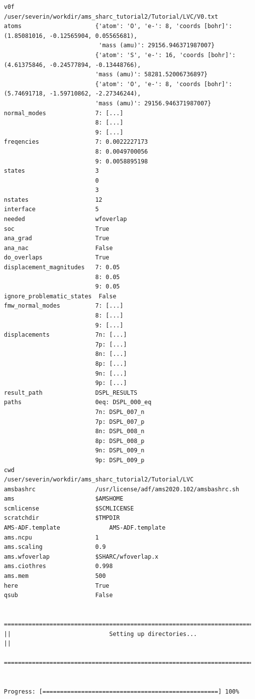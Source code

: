 \documentclass[a4paper,11pt,DIV=15,openany]{scrbook}
\begin{document}
\begin{oframed}
\begin{Verbatim}[commandchars=\\\{\}]
v0f                       /user/severin/workdir/ams_sharc_tutorial2/Tutorial/LVC/V0.txt
atoms                     {'atom': 'O', 'e-': 8, 'coords [bohr]': (1.85081016, -0.12565904, 0.05565681), 
                           'mass (amu)': 29156.946371987007}
                          {'atom': 'S', 'e-': 16, 'coords [bohr]': (4.61375846, -0.24577894, -0.13448766), 
                          'mass (amu)': 58281.52006736897}
                          {'atom': 'O', 'e-': 8, 'coords [bohr]': (5.74691718, -1.59710862, -2.27346244), 
                          'mass (amu)': 29156.946371987007}
normal_modes              7: [...]
                          8: [...]
                          9: [...]
freqencies                7: 0.0022227173
                          8: 0.0049700056
                          9: 0.0058895198
states                    3
                          0
                          3
nstates                   12
interface                 5
needed                    wfoverlap
soc                       True
ana_grad                  True
ana_nac                   False
do_overlaps               True
displacement_magnitudes   7: 0.05
                          8: 0.05
                          9: 0.05
ignore_problematic_states  False
fmw_normal_modes          7: [...]
                          8: [...]
                          9: [...]
displacements             7n: [...]
                          7p: [...]
                          8n: [...] 
                          8p: [...] 
                          9n: [...]
                          9p: [...]
result_path               DSPL_RESULTS
paths                     0eq: DSPL_000_eq
                          7n: DSPL_007_n
                          7p: DSPL_007_p
                          8n: DSPL_008_n
                          8p: DSPL_008_p
                          9n: DSPL_009_n
                          9p: DSPL_009_p
cwd                       /user/severin/workdir/ams_sharc_tutorial2/Tutorial/LVC
amsbashrc                 /usr/license/adf/ams2020.102/amsbashrc.sh
ams                       $AMSHOME
scmlicense                $SCMLICENSE
scratchdir                $TMPDIR
AMS-ADF.template              AMS-ADF.template
ams.ncpu                  1
ams.scaling               0.9
ams.wfoverlap             $SHARC/wfoverlap.x
ams.ciothres              0.998
ams.mem                   500
here                      True
qsub                      False

  ================================================================================
||                            Setting up directories...                           ||
  ================================================================================


Progress: [==================================================] 100%
\end{Verbatim}
\end{oframed}
\end{document}
